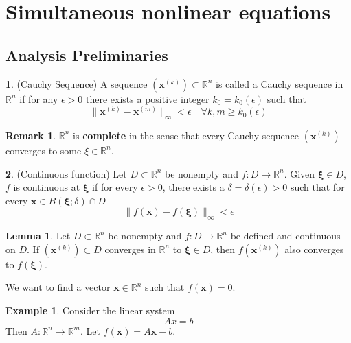 \documentclass[12pt]{article}
\theoremstyle{definition}
\newtheorem{definition}{\color{NavyBlue}{\textbf{Definition}}}
\newcommand{\e}{\epsilon}
\newcommand{\R}{\mathbb{R}}
\newcommand{\norm}[1]{\lVert#1\rVert}
\newcommand{\x}{\bm{x}}
\newcommand{\xib}{\bm{\xi}}
\newtheorem{example}{\color{WildStrawberry}Example}
\newtheorem{lemma}{Lemma}
\newtheorem{remark}{Remark}
\theoremstyle{definition}
\begin{document}
\section{Simultaneous nonlinear equations}

\subsection{Analysis Preliminaries}
\begin{definition}(Cauchy Sequence)
A sequence $(\x^{(k)}) \subset \R^n$ is called a Cauchy sequence in $\R^n$ if for any $\e > 0$ there exists a positive integer $k_0 = k_0(\e)$ such that
\begin{equation}
	\norm{\x^{(k)} - \x^{(m)}}_{\infty} < \e \quad \forall k, m \geq k_0(\e)
\end{equation}
\end{definition}

\begin{remark}
$\R^n$ is \textbf{complete} in the sense that every Cauchy sequence $(\x^{(k)})$ converges to some $\xi \in \R^n$. 
\end{remark}

\begin{definition}(Continuous function)
Let $D \subset \R^n$ be nonempty and $f: D \to \R^n$. Given $\xib \in D$, $f$ is continuous at $\xib$ if for every $\e > 0$, there exists a $\delta = \delta(\e) > 0$ such that for every $\x \in B(\xib; \delta) \cap D$
\begin{equation}
 	\norm{f(\x) - f(\xib)}_\infty < \e
 \end{equation} 
\end{definition}

\begin{lemma}
Let $D \subset \R^n$ be nonempty and $f: D \to \R^n$ be defined and continuous on $D$. If $(\x^{(k)}) \subset D$ converges in $\R^n$ to $\xib \in D$, then $f(\x^{(k)})$ also converges to $f(\xib)$. 
\end{lemma}

We want to find a vector $\x\in \R^n$ such that $f(\x) = 0$.

\begin{example}
Consider the linear system
\begin{equation}
	Ax = b
\end{equation}
Then $A: \R^n \to \R^m$. Let $f(\bm x) = A\x - b$.
\end{example}
\end{document}
